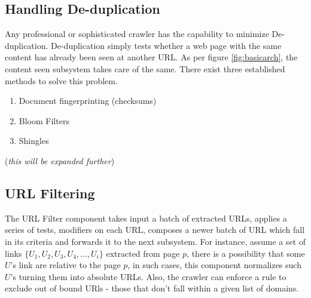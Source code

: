 \subsection{Handling De-duplication}
Any professional or sophisticated crawler has the capability to minimize De-duplication. De-duplication
simply tests whether a web page with the same content has already been seen at another URL. As per
figure \ref{fig:basicarch}, the content seen subsystem takes care of the same. There exist three
established methods to solve this problem. 

\begin{enumerate}
  \item Document fingerprinting (checksums)
  \item Bloom Filters
  \item Shingles
\end{enumerate}

(\textit{this will be expanded further})

\pagebreak

\subsection{URL Filtering}\label{urlfilter}
The URL Filter component takes input a batch of extracted URLs, applies a series of tests, modifiers on each URL, composes a newer batch of URL which fall in its
criteria and forwards it to the next subsystem. For instance, assume a set of links $\{U_1,U_2,U_3,U_4,...,U_i\}$ extracted from page $p$, there is a possibility that some $U$'s link are relative to the page $p$, in
such cases, this component normalizes such $U$'s turning them into absolute URLs. Also, the crawler can
enforce a rule to exclude out of bound URls - those that don't fall within a given list of domains. 


